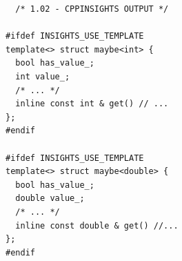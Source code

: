 \begin{verbatim}
  /* 1.02 - CPPINSIGHTS OUTPUT */

#ifdef INSIGHTS_USE_TEMPLATE
template<> struct maybe<int> {
  bool has_value_;
  int value_;
  /* ... */
  inline const int & get() // ...
};
#endif

#ifdef INSIGHTS_USE_TEMPLATE
template<> struct maybe<double> {
  bool has_value_;
  double value_;
  /* ... */
  inline const double & get() //...
};
#endif
\end{verbatim}